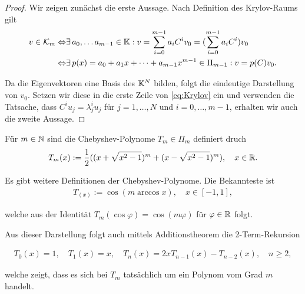 \documentclass{article}
\begin{document}
\begin{proof}
	Wir zeigen zunächst die erste Aussage. Nach Definition des Krylov-Raums gilt
	\begin{align}
		v \in \mathcal{K}_m \Leftrightarrow& \exists \, a_0, \dots a_{m-1} \in \mathbb{K}: v = \sum_{i=0}^{m-1} a_i C^i v_0 = (\sum_{i=0}^{m-1} a_i C^i)v_0\\
		\Leftrightarrow& \exists \, p(x) = a_0 + a_1 x + \dots + a_{m-1} x^{m-1} \in \Pi_{m-1}: v = p(C)v_0.
		\label{eq:Krylov}
	\end{align}

	Da die Eigenvektoren eine Basis des $\mathbb{K}^N$ bilden, folgt die eindeutige Darstellung von $v_0$. Setzen wir diese in die erste Zeile von \ref{eq:Krylov} ein und verwenden die Tatsache, dass $C^i u_j = \lambda_j^i u_j$ für $j=1,\dots, N $ und $i = 0, \dots, m-1$, erhalten wir auch die zweite Aussage.
\end{proof}

\begin{definition}
	Für $m \in \mathbb{N}$ sind die Chebyshev-Polynome $T_m \in \Pi_m$ definiert druch
	\begin{align}\label{chebyshev}
		T_m(x) := \frac{1}{2}((x+ \sqrt{x^2 - 1})^m + (x- \sqrt{x^2 - 1})^m), \quad x \in \mathbb{R}.
	\end{align}
\end{definition}

Es gibt weitere Definitionen der Chebyshev-Polynome. Die Bekannteste ist
\begin{align}
	T_(x) := \cos(m \arccos x), \quad x \in [-1,1],
\end{align}

welche aus der Identität $T_m(\cos \varphi) = \cos (m \varphi)$ für $\varphi \in \mathbb{R}$ folgt.

Aus dieser Darstellung folgt auch mittels Additionstheorem die 2-Term-Rekursion

\begin{align*}
	T_0(x) = 1, \quad T_1(x) = x, \quad T_{n}(x) = 2x T_{n-1}(x) - T_{n-2}(x), \quad n \geq 2,
\end{align*}

welche zeigt, dass es sich bei $T_m$ tatsächlich um ein Polynom vom Grad $m$ handelt.


\end{document}
